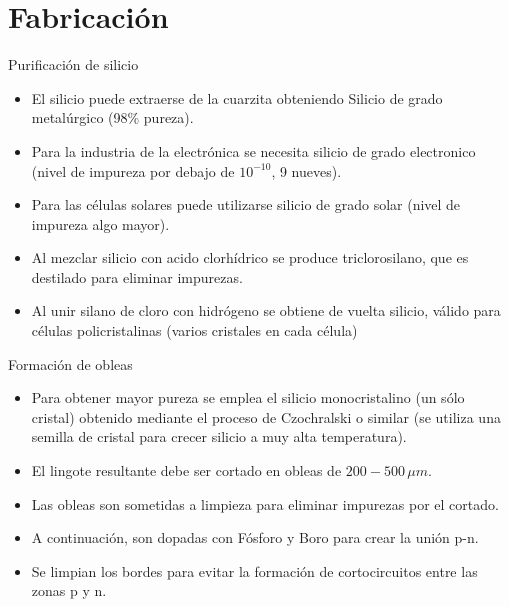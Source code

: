 \documentclass[xcolor={usenames,svgnames,dvipsnames}]{beamer}
\begin{document}
\section{Fabricación}
\label{sec-4}

\begin{frame}[label=sec-4-0-1]{Purificación de silicio}
\begin{itemize}
\item El silicio puede extraerse de la cuarzita obteniendo Silicio de grado
metalúrgico (98\% pureza).

\item Para la industria de la electrónica se necesita silicio de grado
electronico (nivel de impureza por debajo de $10^{-10}$, 9 nueves).

\item Para las células solares puede utilizarse silicio de grado solar
(nivel de impureza algo mayor).

\item Al mezclar silicio con acido clorhídrico se produce triclorosilano,
que es destilado para eliminar impurezas.

\item Al unir silano de cloro con hidrógeno se obtiene de vuelta silicio,
válido para células policristalinas (varios cristales en cada célula)
\end{itemize}
\end{frame}

\begin{frame}[label=sec-4-0-2]{Formación de obleas}
\begin{itemize}
\item Para obtener mayor pureza se emplea el silicio monocristalino (un
sólo cristal) obtenido mediante el proceso de Czochralski o similar
(se utiliza una semilla de cristal para crecer silicio a muy alta
temperatura).

\item El lingote resultante debe ser cortado en obleas de $200-500\,\mu m$.

\item Las obleas son sometidas a limpieza para eliminar impurezas por el
cortado.

\item A continuación, son dopadas con Fósforo y Boro para crear la unión
p-n.

\item Se limpian los bordes para evitar la formación de cortocircuitos
entre las zonas p y n.
\end{itemize}
\end{frame}
\end{document}
